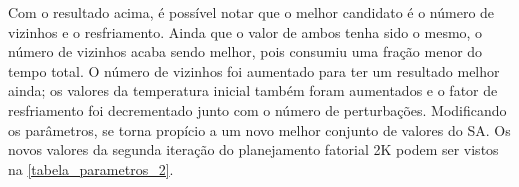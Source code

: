 \documentclass[
	12pt,				%
	openright,			%
	twoside,			%
	a4paper,			%
	english,			%
	french,				%
	spanish,			%
	brazil				%
	]{abntex2}
\begin{document}
Com o resultado acima, é possível notar que o melhor candidato é o número de vizinhos e o resfriamento. Ainda que o valor de ambos tenha sido o mesmo, o número de vizinhos acaba sendo melhor, pois consumiu uma fração menor do tempo total. O número de vizinhos foi aumentado para ter um resultado melhor ainda; os valores da temperatura inicial também foram aumentados e o fator de resfriamento foi decrementado junto com o número de perturbações. Modificando os parâmetros, se torna propício a um novo melhor conjunto de valores do SA. Os novos valores da segunda iteração do planejamento fatorial 2K podem ser vistos na \autoref{tabela_parametros_2}.

\begin{table}[ht]
	\centering
	\caption{Fatores para parâmetro para o \textit{Simulated Annealing} na segunda iteração}
	\label{tabela_parametros_2}
\end{table}
\end{document}
